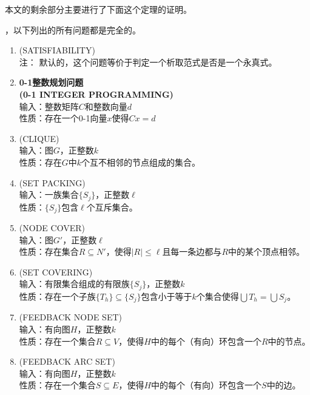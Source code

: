 \documentclass[twocolumn]{article}
\theoremstyle{nonumberplain}%
\begin{document}
\begin{CJK}{UTF8}{gbsn}
    本文的剩余部分主要进行了下面这个定理的证明。

    {}，以下列出的所有问题都是完全的。

    \begin{enumerate}
    \item {(SATISFIABILITY)}\\
    注： 默认的，这个问题等价于判定一个析取范式是否是一个永真式。

    \item {\bf0-1整数规划问题\\(0-1 INTEGER PROGRAMMING)}\\
    输入：整数矩阵$C$和整数向量$d$\\
    性质：存在一个0-1向量$x$使得$Cx=d$

    \item {(CLIQUE)}\\
    输入：图$G$，正整数$k$\\
    性质：存在$G$中$k$个互不相邻的节点组成的集合。

    \item {(SET PACKING)}\\
    输入：一族集合$\{S_j\}$，正整数$\ell$\\
    性质：$\{S_j\}$包含$\ell$个互斥集合。

    \item {(NODE COVER)}\\
    输入：图$G'$，正整数$\ell$\\
    性质：存在集合$R\subseteq N'$，使得$|R|\leq\ell$且每一条边都与$R$中的某个顶点相邻。

    \item {(SET COVERING)}\\
    输入：有限集合组成的有限族$\{S_j\}$，正整数$k$\\
    性质：存在一个子族$\{T_h\}\subseteq\{S_j\}$包含小于等于$k$个集合使得$\bigcup T_h=\bigcup S_j$。

    \item {(FEEDBACK NODE SET)}\\
    输入：有向图$H$，正整数$k$\\
    性质：存在一个集合$R\subseteq V$，使得$H$中的每个（有向）环包含一个$R$中的节点。

    \item {(FEEDBACK ARC SET)}\\
    输入：有向图$H$，正整数$k$\\
    性质：存在一个集合$S\subseteq E$，使得$H$中的每个（有向）环包含一个$S$中的边。


\end{enumerate}
\end{CJK}
\end{document}
